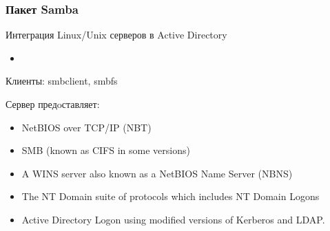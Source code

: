 \begin{frame}
    \frametitle{Пакет Samba}

    Интеграция Linux/Unix серверов в Active Directory
    \begin{itemize}
        \item 
    \end{itemize}

    Клиенты: smbclient, smbfs
    
    Сервер предoставляет:
    \begin{itemize}
        \item NetBIOS over TCP/IP (NBT)
        \item SMB (known as CIFS in some versions)
        \item A WINS server also known as a NetBIOS Name Server (NBNS)
        \item The NT Domain suite of protocols which includes NT Domain Logons
        \item Active Directory Logon using modified versions of Kerberos and LDAP.
    \end{itemize}
    

\end{frame}